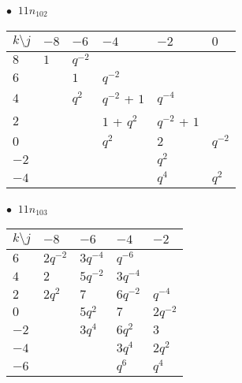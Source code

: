 %
\begin{minipage}{\linewidth}
$\bullet\ $ $11n_{102}$ \vspace{0.5em} \\
\begin{tabular}{l|lllll}
$k \setminus j$ & $-8$ & $-6$ & $-4$ & $-2$ & $0$ \\
\hline
$8$ & $1$ & $q^{-2}$ &  &  &  \\
$6$ &  & $1$ & $q^{-2}$ &  &  \\
$4$ &  & $q^{2}$ & $q^{-2}$ + $1$ & $q^{-4}$ &  \\
$2$ &  &  & $1$ + $q^{2}$ & $q^{-2}$ + $1$ &  \\
$0$ &  &  & $q^{2}$ & $2$ & $q^{-2}$ \\
$-2$ &  &  &  & $q^{2}$ &  \\
$-4$ &  &  &  & $q^{4}$ & $q^{2}$ \\
\end{tabular}
\vspace{2em}
\end{minipage}
%
\begin{minipage}{\linewidth}
$\bullet\ $ $11n_{103}$ \vspace{0.5em} \\
\begin{tabular}{l|llll}
$k \setminus j$ & $-8$ & $-6$ & $-4$ & $-2$ \\
\hline
$6$ & $2q^{-2}$ & $3q^{-4}$ & $q^{-6}$ &  \\
$4$ & $2$ & $5q^{-2}$ & $3q^{-4}$ &  \\
$2$ & $2q^{2}$ & $7$ & $6q^{-2}$ & $q^{-4}$ \\
$0$ &  & $5q^{2}$ & $7$ & $2q^{-2}$ \\
$-2$ &  & $3q^{4}$ & $6q^{2}$ & $3$ \\
$-4$ &  &  & $3q^{4}$ & $2q^{2}$ \\
$-6$ &  &  & $q^{6}$ & $q^{4}$ \\
\end{tabular}
\vspace{2em}
\end{minipage}
%
